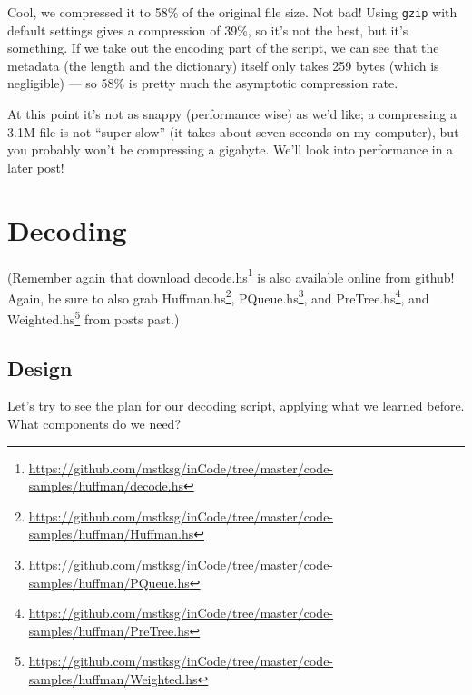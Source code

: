 \documentclass[]{article}
\renewcommand{\href}[2]{#2\footnote{\url{#1}}}
\begin{document}
Cool, we compressed it to 58\% of the original file size. Not bad! Using
\texttt{gzip} with default settings gives a compression of 39\%, so it's not the
best, but it's something. If we take out the encoding part of the script, we can
see that the metadata (the length and the dictionary) itself only takes 259
bytes (which is negligible) --- so 58\% is pretty much the asymptotic
compression rate.

At this point it's not as snappy (performance wise) as we'd like; a compressing
a 3.1M file is not ``super slow'' (it takes about seven seconds on my computer),
but you probably won't be compressing a gigabyte. We'll look into performance in
a later post!

\hypertarget{decoding}{%
\section{Decoding}\label{decoding}}

(Remember again that download
\href{https://github.com/mstksg/inCode/tree/master/code-samples/huffman/decode.hs}{decode.hs}
is also available online from github! Again, be sure to also grab
\href{https://github.com/mstksg/inCode/tree/master/code-samples/huffman/Huffman.hs}{Huffman.hs},
\href{https://github.com/mstksg/inCode/tree/master/code-samples/huffman/PQueue.hs}{PQueue.hs},
and
\href{https://github.com/mstksg/inCode/tree/master/code-samples/huffman/PreTree.hs}{PreTree.hs},
and
\href{https://github.com/mstksg/inCode/tree/master/code-samples/huffman/Weighted.hs}{Weighted.hs}
from posts past.)

\hypertarget{design-1}{%
\subsection{Design}\label{design-1}}

Let's try to see the plan for our decoding script, applying what we learned
before. What components do we need?
\end{document}
